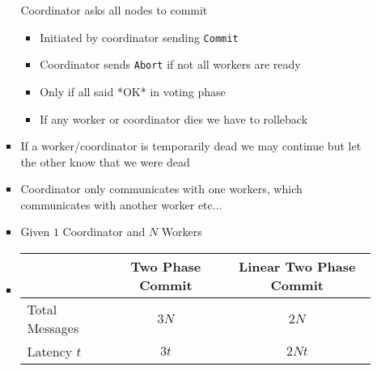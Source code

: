 \begin{itemize}
\begin{itemize}
\begin{itemize}
                     Coordinator asks all nodes to commit
                        \begin{itemize}
                            \item Initiated by coordinator sending \verb+Commit+
                            \item Coordinator sends \verb+Abort+ if not all workers are ready
                            \item Only if all said *OK* in voting phase
                            \item If any worker or coordinator dies we have to rolleback
                        \end{itemize}
                    \item If a worker/coordinator is temporarily dead we may continue but let the other know that we were dead
                \end{itemize}
                \begin{itemize}
                    \item Coordinator only communicates with one workers, which communicates with another worker etc...
                \end{itemize}
                \begin{itemize}
                    \item Given $1$ Coordinator and $N$ Workers
                    \item 
\begin{tabular}{l | c | c}
    & Two Phase Commit & Linear Two Phase Commit\\\hline
    Total Messages & $3N$ & $2N$\\
    Latency $t$ & $3t$ & $2Nt$


\end{tabular}
\end{itemize}
\end{itemize}
\end{itemize}
